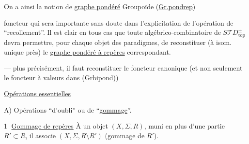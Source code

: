On a ainsi la notion de \uline{graphe pondéré}  
Groupoïde (\uline{Gr.pondrep})

foncteur
qui sera importante sans doute dans l'explicitation de l'opération de ``recollement''. Il est clair en tous cas que toute  algébrico-combinatoire de $S\mathscr T D_{\mathrm{top}}^{\pm}$ devra permettre, pour chaque objet des paradigmes, de reconstituer (à isom. unique près) le \uline{graphe pondéré à repères} correspondant.

--- plus précisément, il faut reconstituer le foncteur canonique
(et non seulement le foncteur à valeurs dans (Grbipond))

\uline{Opérations essentielles}

A) Opérations ``d'oubli'' ou de ``\uline{gommage}''.

\textcircled{1} \uline{Gommage de repères} À un objet $(X,\Sigma,R)$, muni en plus d'une partie $R'\subset R$, il associe $(X,\Sigma,R\setminus R')$ (gommage de $R'$).
